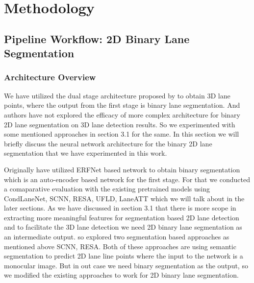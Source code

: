 

    \chapter{Methodology}

    \section{Pipeline Workflow: 2D Binary Lane Segmentation}
        \subsection{Architecture Overview}
        We have utilized the dual stage architecture proposed by \cite{guo2020gen} to obtain 3D lane points, where the output from the first stage is binary lane segmentation. And authors have not explored the efficacy of more complex architecture for binary 2D lane segmentation on 3D lane detection results. So we experimented with some mentioned approaches in section 3.1 for the same. In this section we will briefly discuss the neural network architecture for the binary 2D lane segmentation that we have experimented in this work. 
        
        Originally \cite{guo2020gen} have utilized ERFNet\cite{Romera2018ERFNetER} based network to obtain binary segmentation which is an auto-encoder based network for the first stage. For that we conducted a comaparative evaluation with the existing pretrained models using CondLaneNet\cite{DBLP:journals/corr/abs-2105-05003}, SCNN\cite{pan2018SCNN}, RESA\cite{DBLP:journals/corr/abs-2008-13719}, UFLD\cite{DBLP:journals/corr/abs-2004-11757}, LaneATT\cite{https://doi.org/10.48550/arxiv.2010.12035} which we will talk about in the later sections. As we have discussed in section 3.1 that there is more scope in extracting more meaningful features for segmentation based 2D lane detection and to facilitate the 3D lane detection we need 2D binary lane segmentation as an intermediate output. so explored two segmentation based approaches as mentioned above SCNN\cite{pan2018SCNN}, RESA\cite{DBLP:journals/corr/abs-2008-13719}. Both of these approaches are using semantic segmentation to predict 2D lane line points where the input to the network is a monocular image. But in out case we need binary segmentation as the output, so we modified the existing approaches to work for 2D binary lane segmentation.    
        
